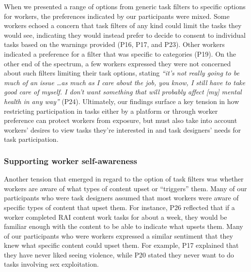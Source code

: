 When we presented a range of options from generic task filters to specific options for workers, the preferences indicated by our participants were mixed. Some workers echoed a concern that task filters of any kind could limit the tasks they would see, indicating they would instead prefer to decide to consent to individual tasks based on the warnings provided (P16, P17, and P23). Other workers indicated a preference for a filter that was specific to categories (P19). On the other end of the spectrum, a few workers expressed they were not concerned about such filters limiting their task options, stating \textit{``it's not really going to be much of an issue \dots as much as I care about the job, you know, I still have to take good care of myself. I don't want something that will probably affect [my] mental health in any way''} (P24). Ultimately, our findings surface a key tension in how restricting participation in tasks either by a platform or through worker preference can protect workers from exposure, but must also take into account workers' desires to view tasks they're interested in and task designers' needs for task participation. 

\subsubsection{Supporting worker self-awareness}
Another tension that emerged in regard to the option of task filters was whether workers are aware of what types of content upset or ``triggers'' them. Many of our participants who were task designers assumed that most workers were aware of specific types of content that upset them. For instance, P26 reflected that if a worker completed RAI content work tasks for about a week, they would be familiar enough with the content to be able to indicate what upsets them. Many of our participants who were workers expressed a similar sentiment that they knew what specific content could upset them. For example, P17 explained that they have never liked seeing violence, while P20 stated they never want to do tasks involving sex exploitation. 

